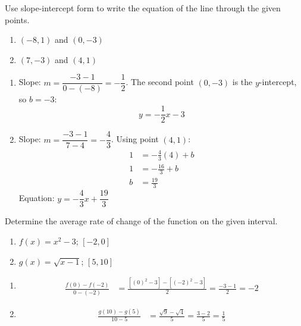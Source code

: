\documentclass{ximera}
\begin{document}
\begin{problem}
Use slope-intercept form to write the equation of the line through the given points.
\begin{enumerate}
  \item[(a)] $(-8,1)$ and $(0,-3)$
  \medskip
  \item[(b)] $(7,-3)$ and $(4,1)$
\end{enumerate}

\begin{solution}
\begin{enumerate}
  \item[(a)] Slope: $m = \dfrac{-3-1}{0-(-8)} = -\dfrac{1}{2}$. The second point $(0,-3)$ is the $y$-intercept, so $b=-3$:
  $$y = -\frac{1}{2}x - 3$$

  \item[(b)] Slope: $m = \dfrac{-3-1}{7-4} = -\dfrac{4}{3}$. Using point $(4,1)$:
  \begin{align*}
    1 &= -\frac{4}{3}(4) + b\\
    1 &= -\frac{16}{3} + b\\
    b &= \frac{19}{3}
  \end{align*}
  Equation: $y = -\dfrac{4}{3}x + \dfrac{19}{3}$
\end{enumerate}
\end{solution}
\end{problem}


\begin{problem}
Determine the average rate of change of the function on the given interval.
\begin{enumerate}
  \item[(a)] $f(x) = x^2 - 3$; $[-2,0]$
  \medskip
  \item[(b)] $g(x) = \sqrt{x-1}$; $[5,10]$
\end{enumerate}

\begin{solution}
\begin{enumerate}
  \item[(a)] \begin{align*}
    \frac{f(0)-f(-2)}{0-(-2)} &= \frac{[(0)^2-3]-[(-2)^2-3]}{2} = \frac{-3-1}{2} = -2
  \end{align*}

  \item[(b)] \begin{align*}
    \frac{g(10)-g(5)}{10-5} &= \frac{\sqrt{9}-\sqrt{4}}{5} = \frac{3-2}{5} = \frac{1}{5}
  \end{align*}
\end{enumerate}
\end{solution}
\end{problem}
\end{document}
